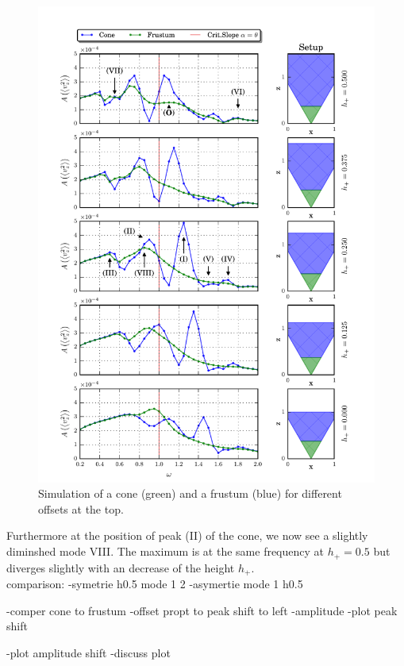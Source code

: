 \begin{figure}[!pt]
  \centering
  \includegraphics{gfx/cone/final/transition.pdf}
  \caption{
      \label{fig:cone:finaltransition}
    Simulation of a cone (green) and a frustum (blue) for different offsets at the
    top.
    }
\end{figure}
\clearpage

Furthermore at the position of peak (\RN{2}) of the cone, we now see a slightly diminshed mode \RN{8}.
The maximum is at the same frequency at $h_+=0.5$ but diverges slightly with an decrease of the height $h_+$.\\
comparison:
-symetrie h0.5 mode 1 2
-asymertie mode 1 h0.5

-comper cone to frustum
-offset propt to peak shift to left
-amplitude
-plot peak shift

-plot amplitude shift
-discuss plot

